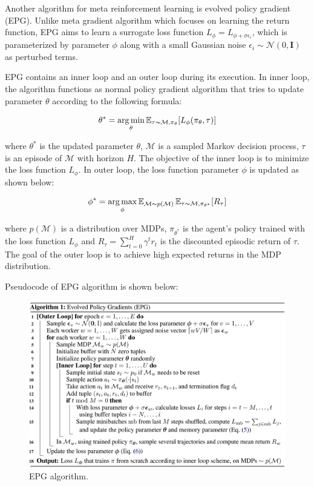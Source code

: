 Another algorithm for meta reinforcement learning is evolved policy gradient (EPG)\cite{epg}. Unlike meta gradient algorithm which focuses on learning the return function, EPG aims to learn a surrogate loss function $L_\phi = L_{\phi + \sigma\epsilon_i}$, which is parameterized by parameter $\phi$ along with a small Gaussian noise $\epsilon_i \sim \mathcal{N}(0, \mathbf{I})$ as perturbed terms.

\par
EPG contains an inner loop and an outer loop during its execution. In inner loop, the algorithm functions as normal policy gradient algorithm that tries to update parameter $\theta$ according to the following formula:

\[\theta^* = \operatorname*{arg\,min}_\theta\operatorname{\mathbb{E}}_{\tau\thicksim\mathcal{M},\pi_\theta}[L_\phi(\pi_\theta,\tau)]\]

where $\theta^*$ is the updated parameter $\theta$, $\mathcal{M}$ is a sampled Markov decision process, $\tau$ is an episode of $\mathcal{M}$ with horizon $\textit{H}$. The objective of the inner loop is to minimize the loss function $L_\phi$. In outer loop, the loss function parameter $\phi$ is updated as shown below:

\[\phi^* = \operatorname*{arg\,max}_\phi\operatorname{\mathbb{E}}_{\mathcal{M}\thicksim p(\mathcal{M})}\operatorname{\mathbb{E}}_{\tau\thicksim\mathcal{M},\pi_{\theta^*}}[R_\tau]\]

where $p(\mathcal{M})$ is a distribution over MDPs, $\pi_{\theta^*}$ is the agent's policy trained with the loss function $L_\phi$ and $R_\tau = \sum_{t=0}^{H}\gamma^t{r_t}$ is the discounted episodic return of $\tau$. The goal of the outer loop is to achieve high expected returns in the MDP distribution.

\par
Pseudocode of EPG algorithm is shown below:
\begin{figure}[H]
	\includegraphics[scale=0.4]{epg.png}
	\centering
	\caption{EPG algorithm.}
	\label{epg}
\end{figure}

